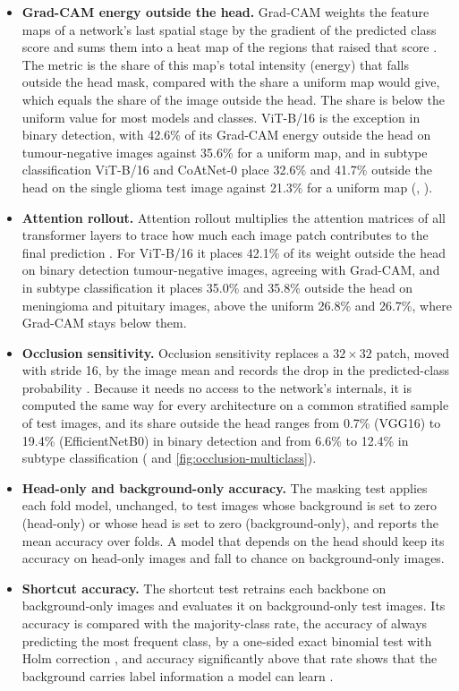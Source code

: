 \documentclass[a4paper,fleqn]{cas-sc}
\begin{document}
\begin{itemize}
\item \textbf{Grad-CAM energy outside the head.} Grad-CAM weights the feature maps of a network's last spatial stage by the gradient of the predicted class score and sums them into a heat map of the regions that raised that score \citep{selvaraju2017}. The metric is the share of this map's total intensity (energy) that falls outside the head mask, compared with the share a uniform map would give, which equals the share of the image outside the head. The share is below the uniform value for most models and classes. ViT-B/16 is the exception in binary detection, with 42.6\% of its Grad-CAM energy outside the head on tumour-negative images against 35.6\% for a uniform map, and in subtype classification ViT-B/16 and CoAtNet-0 place 32.6\% and 41.7\% outside the head on the single glioma test image against 21.3\% for a uniform map (, ).
\item \textbf{Attention rollout.} Attention rollout multiplies the attention matrices of all transformer layers to trace how much each image patch contributes to the final prediction \citep{abnar2020}. For ViT-B/16 it places 42.1\% of its weight outside the head on binary detection tumour-negative images, agreeing with Grad-CAM, and in subtype classification it places 35.0\% and 35.8\% outside the head on meningioma and pituitary images, above the uniform 26.8\% and 26.7\%, where Grad-CAM stays below them.
\item \textbf{Occlusion sensitivity.} Occlusion sensitivity replaces a $32\times 32$ patch, moved with stride 16, by the image mean and records the drop in the predicted-class probability \citep{zeiler2014}. Because it needs no access to the network's internals, it is computed the same way for every architecture on a common stratified sample of test images, and its share outside the head ranges from 0.7\% (VGG16) to 19.4\% (EfficientNetB0) in binary detection and from 6.6\% to 12.4\% in subtype classification ( and \ref{fig:occlusion-multiclass}).
\item \textbf{Head-only and background-only accuracy.} The masking test applies each fold model, unchanged, to test images whose background is set to zero (head-only) or whose head is set to zero (background-only), and reports the mean accuracy over folds. A model that depends on the head should keep its accuracy on head-only images and fall to chance on background-only images.
\item \textbf{Shortcut accuracy.} The shortcut test retrains each backbone on background-only images and evaluates it on background-only test images. Its accuracy is compared with the majority-class rate, the accuracy of always predicting the most frequent class, by a one-sided exact binomial test with Holm correction \citep{holm1979}, and accuracy significantly above that rate shows that the background carries label information a model can learn \citep{geirhos2020}.
\end{itemize}
\end{document}
